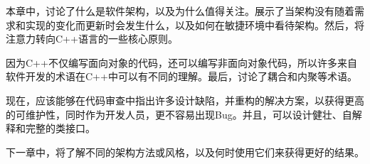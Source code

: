 本章中，讨论了什么是软件架构，以及为什么值得关注。展示了当架构没有随着需求和实现的变化而更新时会发生什么，以及如何在敏捷环境中看待架构。然后，将注意力转向C++语言的一些核心原则。

因为C++不仅编写面向对象的代码，还可以编写非面向对象代码，所以许多来自软件开发的术语在C++中可以有不同的理解。最后，讨论了耦合和内聚等术语。

现在，应该能够在代码审查中指出许多设计缺陷，并重构的解决方案，以获得更高的可维护性，同时作为开发人员，更不容易出现Bug。并且，可以设计健壮、自解释和完整的类接口。

下一章中，将了解不同的架构方法或风格，以及何时使用它们来获得更好的结果。